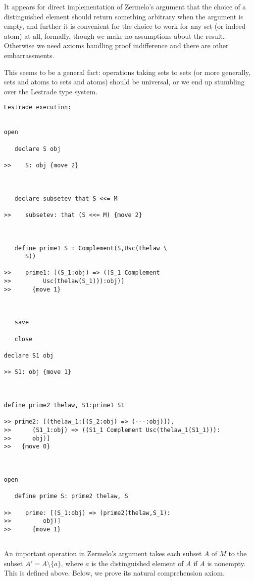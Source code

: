 \documentclass[12pt]{article}
\begin{document}
It appears for direct implementation of Zermelo's argument that the choice of a distinguished element should return something arbitrary when the argument is empty,
and further it is convenient for the choice to work for any set (or indeed atom) at all, formally, though we make no assumptions about the result.  Otherwise we need
axioms handling proof indifference and there are other embarrassments.

This seems to be a general fact:  operations taking sets to sets (or more generally, sets and atoms to sets and atoms) should be universal, or we end up stumbling over the Lestrade type system.

\begin{verbatim}Lestrade execution:


open

   declare S obj

>>    S: obj {move 2}



   declare subsetev that S <<= M

>>    subsetev: that (S <<= M) {move 2}



   define prime1 S : Complement(S,Usc(thelaw \
      S))

>>    prime1: [(S_1:obj) => ((S_1 Complement
>>         Usc(thelaw(S_1))):obj)]
>>      {move 1}



   save

   close

declare S1 obj

>> S1: obj {move 1}



define prime2 thelaw, S1:prime1 S1

>> prime2: [(thelaw_1:[(S_2:obj) => (---:obj)]),
>>      (S1_1:obj) => ((S1_1 Complement Usc(thelaw_1(S1_1))):
>>      obj)]
>>   {move 0}



open

   define prime S: prime2 thelaw, S

>>    prime: [(S_1:obj) => (prime2(thelaw,S_1):
>>         obj)]
>>      {move 1}


\end{verbatim}

An important operation in Zermelo's argument takes each subset $A$ of $M$ to the subset $A' = A \setminus \{a\}$, where $a$ is the distinguished element of $A$ if
$A$ is nonempty.  This is defined above.  Below, we prove its natural comprehension axiom.
\end{document}
